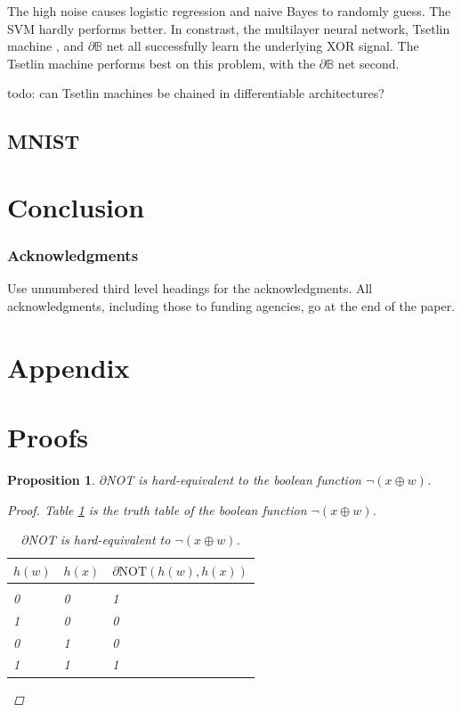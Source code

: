 \documentclass{article} %
\newtheorem{prop}{Proposition}
\begin{document}
The high noise causes logistic regression and naive Bayes to randomly guess. The SVM hardly performs better. In constrast, the multilayer neural network, Tsetlin machine \citep{granmo18}, and  $\partial\mathbb{B}$ net all successfully learn the underlying XOR signal. The Tsetlin machine performs best on this problem, with the $\partial\mathbb{B}$ net second.

todo: can Tsetlin machines be chained in differentiable architectures?

\subsection{MNIST}

\section{Conclusion}


\subsubsection*{Acknowledgments}
Use unnumbered third level headings for the acknowledgments. All
acknowledgments, including those to funding agencies, go at the end of the paper.





\appendix

\section*{Appendix}

\section{Proofs}

\begin{prop}\label{prop:not}
	$\partial${NOT} is hard-equivalent to the boolean function
	$\neg (x \oplus w)$.
\begin{proof}
	Table \ref{not-table} is the truth table of the boolean function $\neg (x \oplus w)$.
	\begin{table}
		\begin{center}
			\begin{tabular}{lll}
				\multicolumn{1}{c}{$h(w)$}  &\multicolumn{1}{c}{$h(x)$} &\multicolumn{1}{c}{$\partial\text{NOT}(h(w), h(x))$}
				\\ \hline \\
				0 & 0 & 1\\
				1 & 0 & 0\\
				0 & 1 & 0\\
				1 & 1 & 1\\
			\end{tabular}
		\end{center}
		\caption{$\partial${NOT} is hard-equivalent to $\neg (x \oplus w)$.}\label{not-table}
		
	\end{table}
\end{proof}
\end{prop}
\end{document}
